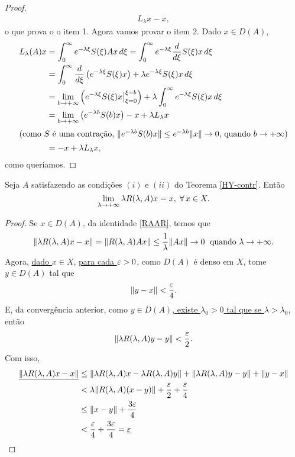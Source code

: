 \begin{proof}
\begin{align*}
L_\lambda x-x,
\end{align*}
o que prova o o item 1. Agora vamos provar o item 2. Dado $x\in D(A)$, 
\begin{align*}
L_\lambda(A)x& =\int_0^{\infty}e^{-\lambda
 \xi}S(\xi)Ax\,d\xi=\int_0^{\infty}e^{-\lambda
 \xi}\frac{d}{d\xi}S(\xi)x\,d\xi\\
& =\int_0^{\infty}\frac{d}{d\xi}\left(e^{-\lambda
 \xi}S(\xi)x\right)+\lambda e^{-\lambda
 \xi}S(\xi)x \,d\xi\\
& =\lim_{b\to +\infty}\left(e^{-\lambda
 \xi}S(\xi)x\big\vert_{\xi=0}^{\xi=b}\right)+\lambda \int_0^{\infty}e^{-\lambda
 \xi}S(\xi)x \,d\xi\\
& =\lim_{b\to +\infty}\left(e^{-\lambda
 b}S(b)x\right)-x+\lambda L_\lambda x\\
\shortintertext{(como $S$ é uma contração, $\|e^{-\lambda b}S(b)x\|\leq e^{-\lambda b}\|x\|\to 0$, quando $b\to +\infty$)}
& =-x+\lambda L_\lambda x,
\end{align*}
como queríamos.
\end{proof}

\begin{lemma} Seja $A$ satisfazendo as condições $(i)$ e $(ii)$ do Teorema \ref{HY-contr}. Então
\begin{equation*}
\lim_{\lambda \to +\infty} \lambda R(\lambda,A) x=x, \; \forall\,x\in X.
\end{equation*}
\end{lemma}
\begin{proof}
Se $x\in D(A)$, da identidade \eqref{RAAR}, temos que
\begin{equation*}
\|\lambda R(\lambda,A) x-x\|=\|R(\lambda,A) Ax\|\leq \frac{1}{\lambda}\|Ax\|\to 0\; 
\text{ quando } \lambda\to +\infty.
\end{equation*}
Agora, \underline{dado $x\in X$}, \underline{para cada $\varepsilon>0$}, como $D(A)$ é denso em $X$, tome $y\in D(A)$ tal que
\[\|y-x\|< \frac{\varepsilon}{4}.\]
E, da convergência anterior, como $y\in D(A)$,\underline{ existe $\lambda_0>0$ tal que se
$\lambda >\lambda_0$}, então
\begin{equation*}
\|\lambda R(\lambda,A) y-y\|< \frac{\varepsilon}{2}.
\end{equation*}
Com isso, 
\begin{align*}
\underline{\|\lambda R(\lambda,A) x-x\|}& \leq \|\lambda R(\lambda,A) x-\lambda R(\lambda,A) y\|
+\|\lambda R(\lambda,A) y-y\|+\|y-x\|\\
& < \lambda \|R(\lambda,A) (x-y)\|+ \frac{\varepsilon}{2}+\frac{\varepsilon}{4}\\
& \leq \|x-y\|+ \frac{3\varepsilon}{4}\\
&< \frac{\varepsilon}{4}+\frac{3\varepsilon}{4}=\underline{\varepsilon}\\
\end{align*}
\end{proof}

